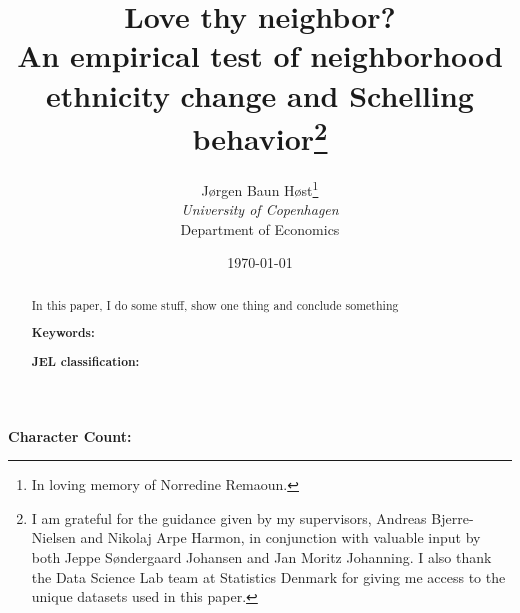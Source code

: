 \documentclass[11pt,a4paper]{article}
\author {
        Jørgen Baun Høst\thanks{In loving memory of Norredine Remaoun.}\\
        \small \textit{University of Copenhagen} \\
        \small Department of Economics}
\title{Love thy neighbor?\\
\vspace{0.35cm}
\Large An empirical test of neighborhood ethnicity change and Schelling behavior\thanks{I am grateful for the guidance given by my supervisors, Andreas Bjerre-Nielsen and Nikolaj Arpe Harmon, in conjunction with valuable input by both Jeppe Søndergaard Johansen and Jan Moritz Johanning. I also thank the Data Science Lab team at Statistics Denmark for giving me access to the unique datasets used in this paper.}
\vspace{0.35cm}
}
\date{\today}
\begin{document}
\begin{spacing}{1}
\maketitle    
\end{spacing}

\vspace*{-1cm}
\begin{abstract}
\noindent
In this paper, I do some stuff, show one thing and conclude something

\medskip
\noindent
\textbf{Keywords:}

\medskip
\noindent
\textbf{JEL classification:} 
\end{abstract}


\newpage 
\begingroup
\begin{spacing}{1.25}
\tableofcontents
\end{spacing}
\endgroup


\vspace{1.5cm}
\begin{center}
\textbf{Character Count:} 
\end{center}

\pagebreak


\pagebreak

 

\pagebreak

 

\pagebreak

 

\pagebreak

 

\pagebreak



\pagebreak

    \printbibliography


\pagebreak


\appendix
\appendixpage


\end{document}
